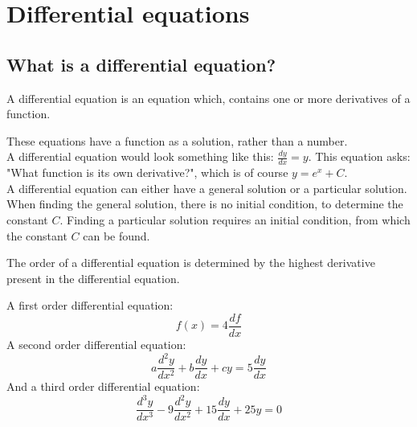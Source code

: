 \chapter{Differential equations}
\section{What is a differential equation?}
\begin{tcolorbox}[colback=blue!5!white,colframe=blue!75!black,title=Definition: Differential equation] 
A differential equation is an equation which, contains one or more derivatives of a function.
\end{tcolorbox}
These equations have a function as a solution, rather than a number. 
\\
A differential equation would look something like this: $\frac{dy}{dx} = y$. This equation asks: "What function is its own derivative?", which is of course $y=e^x+C$.
\\
A differential equation can either have a general solution or a particular solution. When finding the general solution, there is no initial condition, to determine the constant $C$. Finding a particular solution requires an initial condition, from which the constant $C$ can be found.
\\
\begin{tcolorbox}[colback=blue!5!white,colframe=blue!75!black,title=Definition: Order of a differential equation]
The order of a differential equation is determined by the highest derivative present in the differential equation.
\end{tcolorbox} 
\begin{tcolorbox}[colback=red!5!white,colframe=red!55!black,title=Examples of differential equations of different orders] 
A first order differential equation:
$$f(x)=4\frac{df}{dx} $$
A second order differential equation:
$$a\frac{d^2y}{dx^2}+b\frac{dy}{dx}+cy = 5\frac{dy}{dx}$$
And a third order differential equation:
$$\frac{d^3y}{dx^3} - 9\frac{d^2y}{dx^2} + 15\frac{dy}{dx} + 25y = 0$$
\end{tcolorbox}
